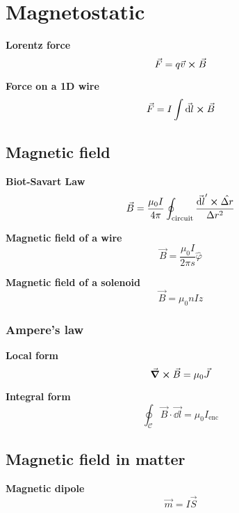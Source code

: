 \documentclass[10pt]{extarticle}
\numberwithin{equation}{section}
\begin{document}
\section{Magnetostatic}
\begin{multicols}{2}
	\textbf{Lorentz force}
	\begin{equation}
		\vec F = q \vec v \cross \vec B
	\end{equation}

	\textbf{Force on a 1D wire}
	\begin{equation}
		\vec F = I \int \vec{\dd l} \cross \vec B
	\end{equation}

	\subsection{Magnetic field}

	\textbf{Biot-Savart Law}
	\begin{equation}
		\vec B = \frac{\mu_0 I}{4 \pi} \oint_\text{circuit} \frac{\vec{\dd l}' \cross \hat{\Delta r}}{\Delta r^2}
	\end{equation}

	\textbf{Magnetic field of a wire}
	\begin{equation}
		\vec B = \frac{\mu_0 I}{2 \pi s} \hat \varphi
	\end{equation}

	\textbf{Magnetic field of a solenoid}
	\begin{equation}
		\vec B = \mu_0 n I \hat z
	\end{equation}

	\subsubsection{Ampere's law}
	\textbf{Local form}
	\begin{equation}
		\curl \vec B = \mu_0 \vec J
	\end{equation}

	\textbf{Integral form}
	\begin{equation}
		\oint_\mathcal{C} \vec B \cdot \vec{\dd l} = \mu_0 I_\text{enc}
	\end{equation}

	\subsection{Magnetic field in matter}

	\textbf{Magnetic dipole}
	\begin{equation}
		\vec m = I \vec S
	\end{equation}


\end{multicols}
\end{document}
